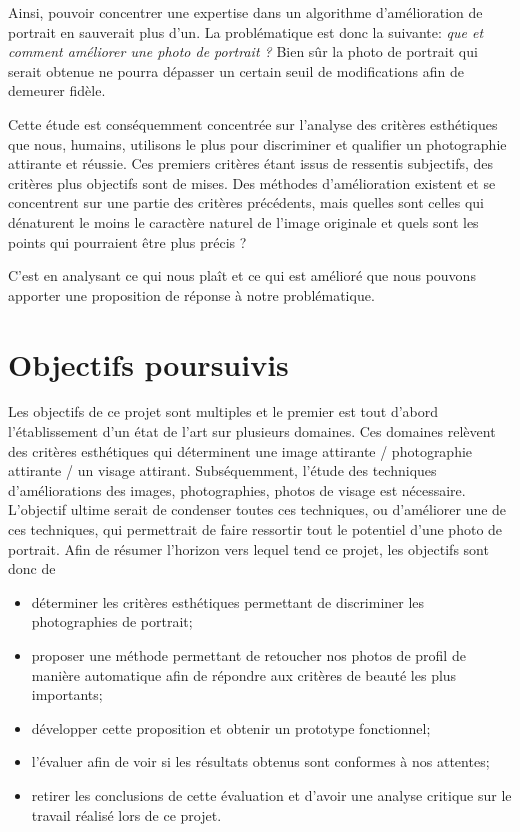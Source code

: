 \documentclass[11pt, french,screen]{report-rd-info}
\begin{document}
Ainsi, pouvoir concentrer une expertise dans un algorithme d'amélioration de portrait en sauverait plus d'un. La problématique est donc la suivante: \emph{que et comment améliorer une photo de portrait ?} Bien sûr la photo de portrait qui serait obtenue ne pourra dépasser un certain seuil de modifications afin de demeurer fidèle.

Cette étude est conséquemment concentrée sur l'analyse des critères esthétiques que nous, humains, utilisons le plus pour discriminer et qualifier un photographie attirante et réussie. Ces premiers critères étant issus de ressentis subjectifs, des critères plus objectifs sont de mises.
Des méthodes d'amélioration existent et se concentrent sur une partie des critères précédents, mais quelles sont celles qui dénaturent le moins le caractère naturel de l'image originale et quels sont les points qui pourraient être plus précis ?

C'est en analysant ce qui nous plaît et ce qui est amélioré que nous pouvons apporter une proposition de réponse à notre problématique.
\section{Objectifs poursuivis}
Les objectifs de ce projet sont multiples et le premier est tout d'abord l'établissement d'un état de l'art sur plusieurs domaines. Ces domaines relèvent des critères esthétiques qui déterminent une image attirante / photographie attirante / un visage attirant. Subséquemment, l'étude des techniques d'améliorations des images, photographies, photos de visage est nécessaire. L'objectif ultime serait de condenser toutes ces techniques, ou d'améliorer une de ces techniques, qui permettrait de faire ressortir tout le potentiel d'une photo de portrait. Afin de résumer l'horizon vers lequel tend ce projet, les objectifs sont donc de
\begin{itemize}
\item déterminer les critères esthétiques permettant de discriminer les photographies de portrait;
\item proposer une méthode permettant de retoucher nos photos de profil de manière automatique afin de répondre aux critères de beauté les plus importants;
\item développer cette proposition et obtenir un prototype fonctionnel;
\item l'évaluer afin de voir si les résultats obtenus sont conformes à nos attentes;
\item retirer les conclusions de cette évaluation et d'avoir une analyse critique sur le travail réalisé lors de ce projet.
\end{itemize}
\end{document}
